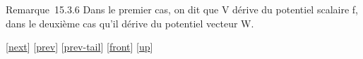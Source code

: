 \documentclass[]{article}
\begin{document}
Remarque~15.3.6 Dans le premier cas, on dit que V dérive du potentiel
scalaire f, dans le deuxième cas qu'il dérive du potentiel vecteur W.

{[}\href{coursse85.html}{next}{]} {[}\href{coursse83.html}{prev}{]}
{[}\href{coursse83.html\#tailcoursse83.html}{prev-tail}{]}
{[}\href{coursse84.html}{front}{]}
{[}\href{coursch16.html\#coursse84.html}{up}{]}
\end{document}
